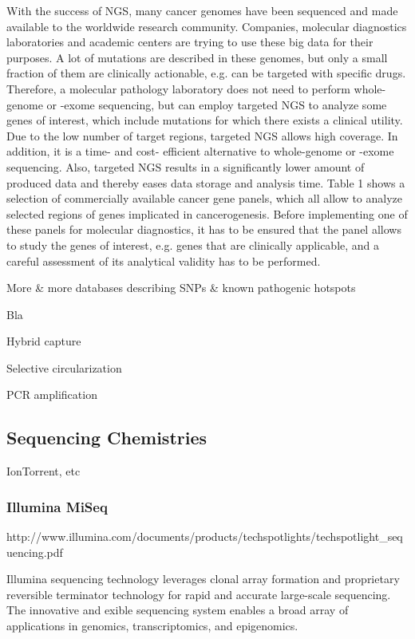 With the success of NGS, many cancer genomes have been sequenced and made
available to the worldwide research community. Companies, molecular diagnostics
laboratories and academic centers are trying to use these big data for their
purposes. A lot of mutations are described in these genomes, but only a small
fraction of them are clinically actionable, e.g. can be targeted with specific
drugs. Therefore, a molecular pathology laboratory does not need to perform
whole-genome or -exome sequencing, but can employ targeted NGS to analyze some
genes of interest, which include mutations for which there exists a clinical
utility. Due to the low number of target regions, targeted NGS allows high
coverage. In addition, it is a time- and cost- efficient alternative to
whole-genome or -exome sequencing. Also, targeted NGS results in a significantly
lower amount of produced data and thereby eases data storage and analysis time.
Table 1 shows a selection of commercially available cancer gene panels, which
all allow to analyze selected regions of genes implicated in cancerogenesis.
Before implementing one of these panels for molecular diagnostics, it has to be
ensured that the panel allows to study the genes of interest, e.g. genes that
are clinically applicable, and a careful assessment of its analytical validity
has to be performed.

More \& more databases describing SNPs \& known pathogenic hotspots

Bla {\cite{enrichment_methods:2011}}

Hybrid capture

Selective circularization

PCR amplification

\subsection{Sequencing Chemistries}

IonTorrent, etc

\subsubsection{Illumina MiSeq}

http://www.illumina.com/documents/products/techspotlights/techspotlight_sequencing.pdf

Illumina sequencing technology leverages clonal array formation and proprietary reversible terminator technology for rapid and accurate large-scale sequencing. The innovative and  exible sequencing system enables a broad array of applications in genomics, transcriptomics, and epigenomics.

